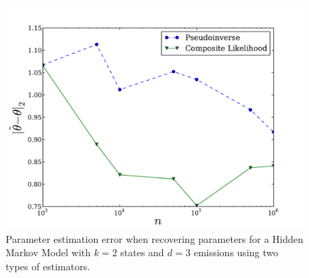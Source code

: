 \begin{figure}
  \centering
  \includegraphics[width=0.8\columnwidth]{figures/hmm-2-3.pdf}
  \caption{Parameter estimation error when recovering parameters for a Hidden
  Markov Model with $k=2$ states and $d=3$ emissions using two types of estimators.}
    \label{fig:cl-hmm}
\end{figure}
